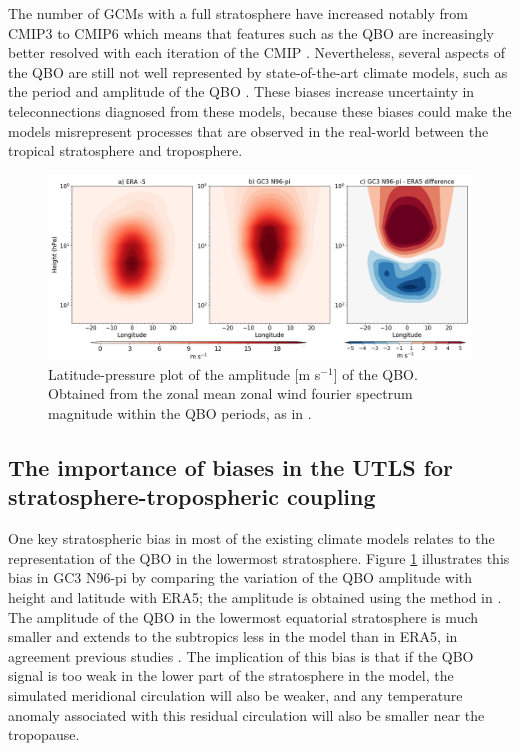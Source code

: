 The number of GCMs with a full stratosphere have increased notably from CMIP3 to CMIP6 which means that features such as the QBO are increasingly better resolved with each iteration of the CMIP \citep{bushell2020,richter2020}. Nevertheless, several aspects of the QBO are still not well represented by state-of-the-art climate models, such as the period and amplitude of the QBO \citep{schenzinger2017,richter2020}. 
These biases increase uncertainty in teleconnections diagnosed from these models, because these biases could make the models misrepresent processes that are observed in the real-world between the tropical stratosphere and troposphere.

\begin{figure}[t!]
\centering
 \includegraphics[width=\linewidth]{figures/qboamplitude.png}
\caption[QBO amplitude bias]{Latitude-pressure plot of the amplitude [m s$^{-1}$] of the QBO. Obtained from the zonal mean zonal wind fourier spectrum magnitude within the QBO periods, as in \cite{schenzinger2017}. }
\label{fig:qboamplitude}
\end{figure}

\subsection{The importance of biases in the UTLS for stratosphere-tropospheric coupling}

One key stratospheric bias in most of the existing climate models relates to the representation of the QBO in the lowermost stratosphere. Figure \ref{fig:qboamplitude} illustrates this bias in GC3 N96-pi by comparing the variation of the QBO amplitude  with height and latitude with ERA5; the amplitude is obtained using the method in \cite{schenzinger2017}. The amplitude of the QBO in the lowermost equatorial stratosphere is much smaller and extends to the subtropics less in the model than in ERA5, in agreement previous studies \citep{schenzinger2017,richter2020,bushell2020}. The implication of this bias is that if the QBO signal is too weak in the lower part of the stratosphere in the model, the simulated meridional circulation will also be weaker, and any temperature anomaly associated with this residual circulation will also be smaller near the tropopause. 

